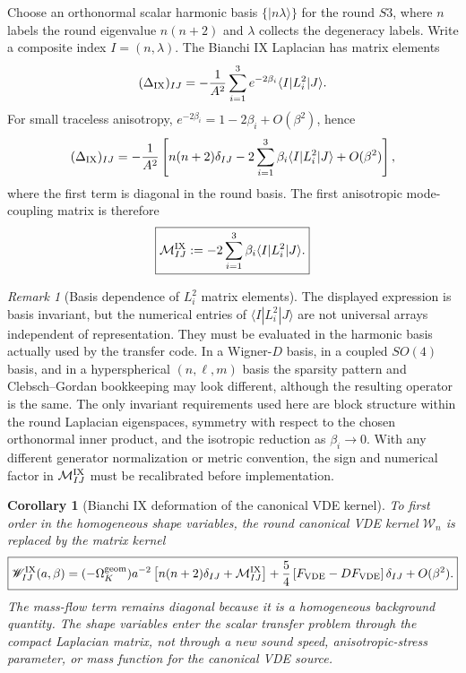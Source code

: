 \documentclass[11pt,a4paper]{article}
\def\Sthree{S3}%
\def\Dil{D}%
\numberwithin{equation}{section}
\theoremstyle{definition}
\theoremstyle{plain}
\newtheorem{corollary}[criterion]{Corollary}
\theoremstyle{remark}
\newtheorem{remark}[criterion]{Remark}
\newcommand{\Sthree}{S^3}
\newcommand{\Dil}{\mathscr{D}}
\begin{document}
Choose an orthonormal scalar harmonic basis \(\{|n\lambda\rangle\}\) for the round
\(\Sthree\), where \(n\) labels the round eigenvalue \(n(n+2)\) and \(\lambda\)
collects the degeneracy labels.  Write a composite index \(I=(n,\lambda)\).  The
Bianchi IX Laplacian has matrix elements
\begin{equation}
(\Delta_{\rm IX})_{IJ}
=-\frac1{A^2}\sum_{i=1}^3 e^{-2\beta_i}\langle I|L_i^2|J\rangle .
\end{equation}
For small traceless anisotropy, \(e^{-2\beta_i}=1-2\beta_i+O(\beta^2)\), hence
\begin{equation}
(\Delta_{\rm IX})_{IJ}
=-\frac1{A^2}
\left[
 n(n+2)\delta_{IJ}
 -2\sum_{i=1}^3\beta_i\langle I|L_i^2|J\rangle
 +O(\beta^2)
\right],
\end{equation}
where the first term is diagonal in the round basis.  The first anisotropic
mode-coupling matrix is therefore
\begin{equation}
\boxed{
\mathcal M^{\rm IX}_{IJ}
:=-2\sum_{i=1}^3\beta_i\langle I|L_i^2|J\rangle .}
\label{eq:BIX-mode-coupling}
\end{equation}

\begin{remark}[Basis dependence of \(L_i^2\) matrix elements]
The displayed expression is basis invariant, but the numerical entries of \(\langle I|L_i^2|J\rangle\) are not universal arrays independent of representation.  They must be evaluated in the harmonic basis actually used by the transfer code.  In a Wigner-\(D\) basis, in a coupled \(SO(4)\) basis, and in a hyperspherical \((n,\ell,m)\) basis the sparsity pattern and Clebsch--Gordan bookkeeping may look different, although the resulting operator is the same.  The only invariant requirements used here are block structure within the round Laplacian eigenspaces, symmetry with respect to the chosen orthonormal inner product, and the isotropic reduction as \(\beta_i\to0\). With any different generator normalization or metric convention, the sign and numerical factor in \(\mathcal M^{\rm IX}_{IJ}\) must be recalibrated before implementation.
\end{remark}

\begin{corollary}[Bianchi IX deformation of the canonical VDE kernel]
\label{cor:BIX-VDE-kernel}
To first order in the homogeneous shape variables, the round canonical VDE
kernel \(\mathscr W_n\) is replaced by the matrix kernel
\begin{equation}
\boxed{
\mathscr W^{\rm IX}_{IJ}(a,\beta)=
(-\Omega_K^{\rm geom})a^{-2}
\left[n(n+2)\delta_{IJ}+\mathcal M^{\rm IX}_{IJ}\right]
+\frac54\left[F_{\rm VDE}-\Dil F_{\rm VDE}\right]\delta_{IJ}
+O(\beta^2).}
\label{eq:BIX-VDE-kernel}
\end{equation}
The mass-flow term remains diagonal because it is a homogeneous background
quantity.  The shape variables enter the scalar transfer problem through the
compact Laplacian matrix, not through a new sound speed, anisotropic-stress
parameter, or mass function for the canonical VDE source.
\end{corollary}
\end{document}

